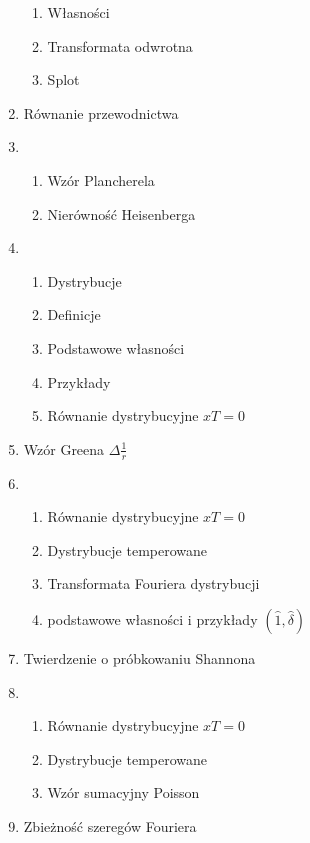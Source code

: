 \documentclass[main.tex]{subfiles}
\begin{document}
\begin{enumerate}
\begin{enumerate}
                \item Własności
                \item Transformata odwrotna
                \item Splot
            \end{enumerate}
        \item Równanie przewodnictwa
        \item
            \begin{enumerate}
                \item Wzór Plancherela
                \item Nierówność Heisenberga
            \end{enumerate}
        \item
            \begin{enumerate}
                \item Dystrybucje
                \item Definicje
                \item Podstawowe własności
                \item Przykłady
                \item Równanie dystrybucyjne $x T = 0$
            \end{enumerate}
        \item Wzór Greena $\Delta \frac{1}{r}$
        \item
            \begin{enumerate}
                \item Równanie dystrybucyjne $x T = 0$
                \item Dystrybucje temperowane
                \item Transformata Fouriera dystrybucji
                \item podstawowe własności i przykłady $(\hat{1}, \hat{\delta})$
            \end{enumerate}
        \item Twierdzenie o próbkowaniu Shannona
        \item
            \begin{enumerate}
                \item Równanie dystrybucyjne $x T = 0$
                \item Dystrybucje temperowane
                \item Wzór sumacyjny Poisson
            \end{enumerate}
        \item Zbieżność szeregów Fouriera
    \end{enumerate}
\end{document}

